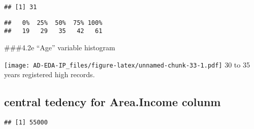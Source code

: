 \documentclass[
]{article}
\newenvironment{Shaded}{\begin{snugshade}}{\end{snugshade}}
\newcommand{\CommentTok}[1]{\textcolor[rgb]{0.56,0.35,0.01}{\textit{#1}}}
\newcommand{\FunctionTok}[1]{\textcolor[rgb]{0.00,0.00,0.00}{#1}}
\newcommand{\NormalTok}[1]{#1}
\newcommand{\OtherTok}[1]{\textcolor[rgb]{0.56,0.35,0.01}{#1}}
\newcommand{\SpecialCharTok}[1]{\textcolor[rgb]{0.00,0.00,0.00}{#1}}
\begin{document}
\begin{verbatim}
## [1] 31
\end{verbatim}

\begin{Shaded}
\end{Shaded}

\begin{verbatim}
##   0%  25%  50%  75% 100% 
##   19   29   35   42   61
\end{verbatim}

\#\#\#4.2e ``Age'' variable histogram

\begin{Shaded}
\end{Shaded}

\texttt{[image: AD-EDA-IP\_files/figure-latex/unnamed-chunk-33-1.pdf]} 30
to 35 years registered high records.

\hypertarget{central-tedency-for-area.income-colunm}{%
\subsection{central tedency for Area.Income
colunm}\label{central-tedency-for-area.income-colunm}}

\begin{Shaded}
\end{Shaded}

\begin{verbatim}
## [1] 55000
\end{verbatim}

\begin{Shaded}
\end{Shaded}
\end{document}
